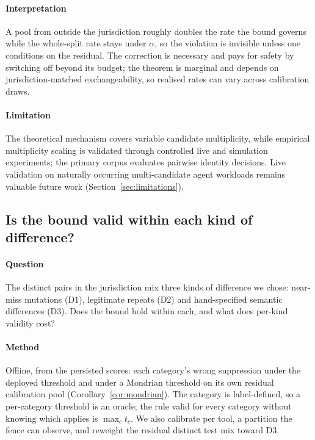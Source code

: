 

\paragraph{Interpretation} A pool from outside the jurisdiction roughly doubles the rate the bound governs while the whole-split rate stays under $\alpha$, so the violation is invisible unless one conditions on the residual. The correction is necessary and pays for safety by switching off beyond its budget; the theorem is marginal and depends on jurisdiction-matched exchangeability, so realised rates can vary across calibration draws.

\paragraph{Limitation} The theoretical mechanism covers variable candidate multiplicity, while empirical multiplicity scaling is validated through controlled live and simulation experiments; the primary corpus evaluates pairwise identity decisions. Live validation on naturally occurring multi-candidate agent workloads remains valuable future work (Section~\ref{sec:limitations}).

\subsection{Is the bound valid within each kind of difference?}\label{sec:res-class}

\paragraph{Question} The distinct pairs in the jurisdiction mix three kinds of difference we chose: near-miss mutations (D1), legitimate repeats (D2) and hand-specified semantic differences (D3). Does the bound hold within each, and what does per-kind validity cost?

\paragraph{Method} Offline, from the persisted scores: each category's wrong suppression under the deployed threshold and under a Mondrian threshold on its own residual calibration pool (Corollary~\ref{cor:mondrian}). The category is label-defined, so a per-category threshold is an oracle; the rule valid for every category without knowing which applies is $\max_c t_c$. We also calibrate per tool, a partition the fence can observe, and reweight the residual distinct test mix toward D3.

